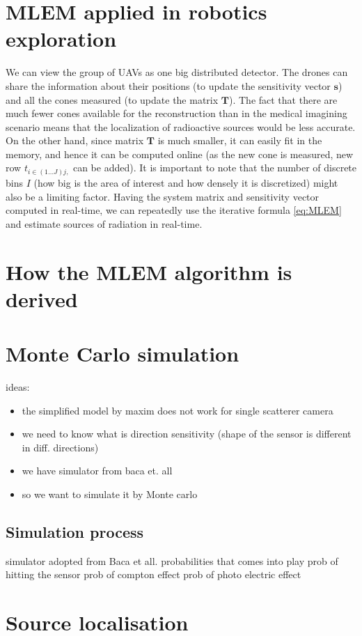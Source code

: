 \section{MLEM applied in robotics exploration}
We can view the group of \ac{UAV}s as one big distributed detector.
The drones can share the information about their positions (to update the sensitivity vector $\mathbf{s}$) and all the cones measured (to update the matrix $\mathbf{T}$).
The fact that there are much fewer cones available for the reconstruction than in the medical imagining scenario means that the localization of radioactive sources would be less accurate. 
On the other hand, since matrix $\mathbf{T}$ is much smaller, it can easily fit in the memory, and hence it can be computed online (as the new cone is measured, new row $t_{i\in(1 \dotsc J) j,}$ can be added). 
It is important to note that the number of discrete bins $I$ (how big is the area of interest and how densely it is discretized) might also be a limiting factor.
Having the system matrix and sensitivity vector computed in real-time, we can repeatedly use the iterative formula \ref{eq:MLEM} and estimate sources of radiation in real-time.

\section{How the MLEM algorithm is derived}


\section{Monte Carlo simulation}


ideas:
\begin{itemize}
  \item the simplified model by maxim does not work for single scatterer camera
  \item we need to know what is direction sensitivity (shape of the sensor is different in diff. directions)
  \item we have simulator from baca et. all
  \item so we want to simulate it by Monte carlo
\end{itemize}

\subsection{Simulation process}

simulator adopted from Baca et all.
probabilities that comes into play
prob of hitting the sensor
prob of compton effect
prob of photo electric effect

\section{Source localisation}
